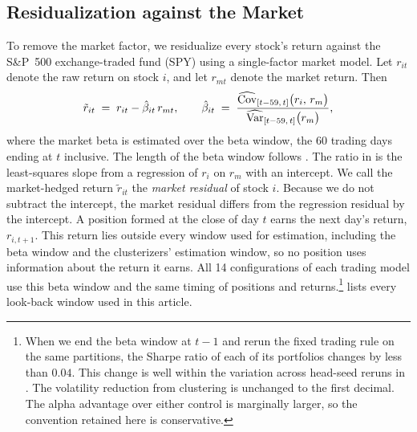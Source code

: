 
\subsection{Residualization against the Market}
\label{sec:resid}

To remove the market factor, we residualize every stock's return
against the S\&P~500 exchange-traded fund (SPY) using a single-factor
market model. 
Let $r_{it}$ denote the raw return on stock $i$, and let $r_{mt}$ denote the market return. Then
%
\begin{equation}\label{eq:residual}
  \tilde r_{it} \;=\; r_{it} - \hat\beta_{it}\, r_{mt},
  \qquad
  \hat\beta_{it}
  \;=\;
  \frac{\widehat{\mathrm{Cov}}_{[t-59,\,t]}\bigl(r_i,\, r_m\bigr)}
       {\widehat{\mathrm{Var}}_{[t-59,\,t]}\bigl(r_m\bigr)},
\end{equation}
%
where the market beta is estimated over the beta window, the 60 trading days ending at $t$
inclusive. The length of the beta window follows \citet{avellaneda2010statistical}. The ratio in  is the least-squares slope from a regression of $r_i$ on $r_m$ with an intercept. We call the market-hedged return $\tilde r_{it}$ the \emph{market residual} of stock $i$. Because we do not subtract the intercept, the market residual differs from the regression residual by the intercept. A position formed at the close of day $t$ earns the next day's return, $r_{i,t+1}$. This return lies outside every window used for estimation, including the beta window and the clusterizers' estimation window, so no position uses information about the return it earns. All 14 configurations of each trading model use this beta window and the same timing of positions and returns.\footnote{When we end the beta window at $t-1$ and rerun the fixed trading rule on the same partitions, the Sharpe ratio of each of its portfolios changes by less than $0.04$. This change is well within the variation across head-seed reruns in . The volatility reduction from clustering is unchanged to the first decimal. The alpha advantage over either control is marginally larger, so the convention retained here is conservative.}  lists every look-back window used in this article.

